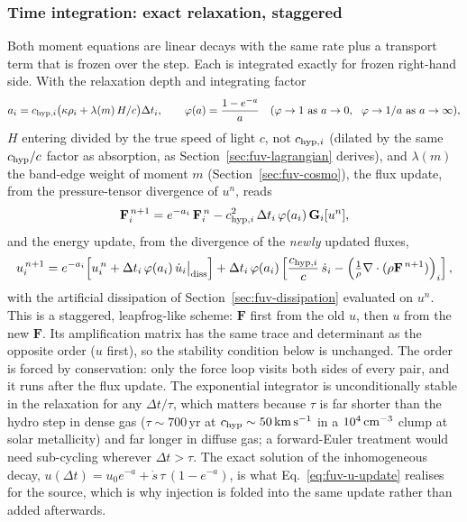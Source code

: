 \subsubsection{Time integration: exact relaxation, staggered}
\label{sec:fuv-time}

Both moment equations are linear decays with the same rate plus a
transport term that is frozen over the step. Each is integrated exactly
for frozen right-hand side. With the relaxation depth and integrating
factor
\begin{equation}
  a_i = c_{{\rm hyp},i}\big(\kappa\rho_i + \lambda(m)\,H/c\big)\Delta t_i , \qquad
  \varphi(a) = \frac{1-e^{-a}}{a}
  \quad (\varphi\to1 \text{ as } a\to0,\ \ \varphi\to1/a \text{ as } a\to\infty),
  \label{eq:fuv-phi}
\end{equation}
$H$ entering divided by the true speed of light $c$, not
$c_{{\rm hyp},i}$ (dilated by the same $c_{\rm hyp}/c$ factor as
absorption, as Section~\ref{sec:fuv-lagrangian} derives), and
$\lambda(m)$ the band-edge weight of moment $m$
(Section~\ref{sec:fuv-cosmo}), the flux
update, from the pressure-tensor divergence of $u^n$, reads
\begin{equation}
  \mathbf F_i^{\,n+1} = e^{-a_i}\,\mathbf F_i^{\,n}
    - c_{{\rm hyp},i}^2\,\Delta t_i\,\varphi(a_i)\,\mathbf G_i[u^n] ,
  \label{eq:fuv-F-update}
\end{equation}
and the energy update, from the divergence of the \emph{newly} updated
fluxes,
\begin{equation}
  u_i^{\,n+1} = e^{-a_i}\Big[u_i^{\,n}
      + \Delta t_i\,\varphi(a_i)\,\dot u_i\big|_{\rm diss}\Big]
    + \Delta t_i\,\varphi(a_i)\left[\frac{c_{{\rm hyp},i}}{c}\,\dot s_i
      - \Big(\tfrac{1}{\rho}\nabla\cdot(\rho\mathbf F^{\,n+1})\Big)_i\right] ,
  \label{eq:fuv-u-update}
\end{equation}
with the artificial dissipation of Section~\ref{sec:fuv-dissipation}
evaluated on $u^n$. This is a staggered, leapfrog-like scheme: $\mathbf F$
first from the old $u$, then $u$ from the new $\mathbf F$. Its
amplification matrix has the same trace and determinant as the opposite
order ($u$ first), so the stability condition below is unchanged. The order is
forced by conservation: only the force loop visits both sides of every
pair, and it runs after the flux update. The exponential
integrator is unconditionally stable in the relaxation for any $\Delta
t/\tau$, which matters because $\tau$ is far shorter than the hydro
step in dense gas ($\tau\sim700$\,yr at $c_{\rm hyp}\sim50\,{\rm
km\,s^{-1}}$ in a $10^4\,{\rm cm^{-3}}$ clump at solar metallicity) and
far longer in diffuse gas; a forward-Euler treatment would need
sub-cycling wherever $\Delta t >
\tau$. The
exact solution of the inhomogeneous decay, $u(\Delta t) = u_0 e^{-a} +
\dot s\,\tau\,(1-e^{-a})$, is what Eq.~\ref{eq:fuv-u-update} realises
for the source, which is why injection is folded into the same update
rather than added afterwards.

